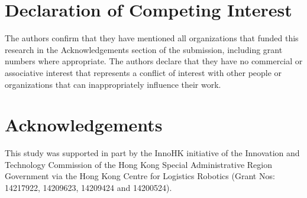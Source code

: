 \documentclass[a4paper,fleqn]{cas-sc}
\begin{document}
\section{Declaration of Competing Interest}

The authors confirm that they have mentioned all organizations that funded this research in the Acknowledgements section of the submission, including grant numbers where appropriate. The authors declare that they have no commercial or associative interest that represents a conflict of interest with other people or organizations that can inappropriately influence their work.


\section{Acknowledgements}

This study was supported in part by the InnoHK initiative of the Innovation and Technology Commission of the Hong Kong Special Administrative Region Government via the Hong Kong Centre for Logistics Robotics (Grant Nos: 14217922, 14209623, 14209424 and 14200524).

\printcredits

%
%



\end{document}
